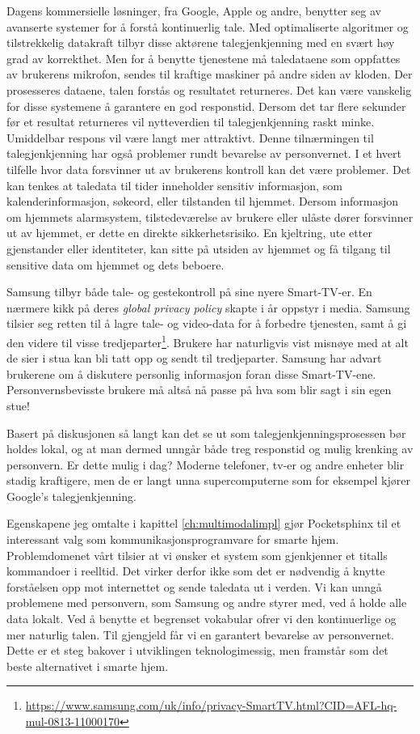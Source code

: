 Dagens kommersielle løsninger, fra Google, Apple og andre, benytter seg av avanserte systemer for å forstå kontinuerlig tale. Med optimaliserte algoritmer og tilstrekkelig datakraft tilbyr disse aktørene talegjenkjenning med en svært høy grad av korrekthet. Men for å benytte tjenestene må taledataene som oppfattes av brukerens mikrofon, sendes til kraftige maskiner på andre siden av kloden. Der prosesseres dataene, talen forstås og resultatet returneres. Det kan være vanskelig for disse systemene å garantere en god responstid. Dersom det tar flere sekunder før et resultat returneres vil nytteverdien til talegjenkjenning raskt minke. Umiddelbar respons vil være langt mer attraktivt. Denne tilnærmingen til talegjenkjenning har også problemer rundt bevarelse av personvernet. I et hvert tilfelle hvor data forsvinner ut av brukerens kontroll kan det være problemer. Det kan tenkes at taledata til tider inneholder sensitiv informasjon, som kalenderinformasjon, søkeord, eller tilstanden til hjemmet. Dersom informasjon om hjemmets alarmsystem, tilstedeværelse av brukere eller ulåste dører forsvinner ut av hjemmet, er dette en direkte sikkerhetsrisiko. En kjeltring, ute etter gjenstander eller identiteter, kan sitte på utsiden av hjemmet og få tilgang til sensitive data om hjemmet og dets beboere.

Samsung tilbyr både tale- og gestekontroll på sine nyere Smart-TV-er. En nærmere kikk på deres \emph{global privacy policy} skapte i år oppstyr i media. Samsung tilsier seg retten til å lagre tale- og video-data for å forbedre tjenesten, samt å gi den videre til visse tredjeparter\footnote{\url{https://www.samsung.com/uk/info/privacy-SmartTV.html?CID=AFL-hq-mul-0813-11000170}}. Brukere har naturligvis vist misnøye med at alt de sier i stua kan bli tatt opp og sendt til tredjeparter. Samsung har advart brukerene om å diskutere personlig informasjon foran disse Smart-TV-ene. Personvernsbevisste brukere må altså nå passe på hva som blir sagt i sin egen stue!

Basert på diskusjonen så langt kan det se ut som talegjenkjenningsprosessen bør holdes lokal, og at man dermed unngår både treg responstid og mulig krenking av personvern. Er dette mulig i dag? Moderne telefoner, tv-er og andre enheter blir stadig kraftigere, men de er langt unna supercomputerne som for eksempel kjører Google's talegjenkjenning.

Egenskapene jeg omtalte i kapittel \ref{ch:multimodalimpl} gjør Pocketsphinx til et interessant valg som kommunikasjonsprogramvare for smarte hjem. Problemdomenet vårt tilsier at vi ønsker et system som gjenkjenner et titalls kommandoer i reelltid. Det virker derfor ikke som det er nødvendig å knytte forståelsen opp mot internettet og sende taledata ut i verden. Vi kan unngå problemene med personvern, som Samsung og andre styrer med, ved å holde alle data lokalt. Ved å benytte et begrenset vokabular ofrer vi den kontinuerlige og mer naturlig talen. Til gjengjeld får vi en garantert bevarelse av personvernet. Dette er et steg bakover i utviklingen teknologimessig, men framstår som det beste alternativet i smarte hjem.

